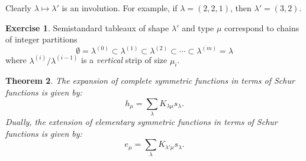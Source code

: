 \documentclass[11pt]{amsart}
\newtheorem{theorem}{Theorem}[subsection]
\theoremstyle{definition}
\theoremstyle{example}
\newtheorem{exercise}[theorem]{Exercise}
\begin{document}
Clearly $\lambda\mapsto\lambda'$ is an involution.
For example, if $\lambda=(2,2,1)$, then $\lambda'=(3,2)$.
\begin{exercise}
Semistandard tableaux of shape $\lambda'$ and type $\mu$ correspond to chains of integer partitions
  \begin{displaymath}
    \emptyset = \lambda^{(0)} \subset \lambda^{(1)}\subset \lambda^{(2)} \subset \dotsb \subset \lambda^{(m)} = \lambda
  \end{displaymath}
  where $\lambda^{(i)}/\lambda^{(i-1)}$ is a \emph{vertical} strip of size $\mu_i$.  
\end{exercise}
\begin{theorem}
  \label{theorem:schur-to-eh}
  The expansion of complete symmetric functions in terms of Schur functions is given by:
  \begin{displaymath}
    h_\mu = \sum_\lambda K_{\lambda\mu}s_\lambda.
  \end{displaymath}
  Dually, the extension of elementary symmetric functions in terms of Schur functions is given by:
  \begin{displaymath}
    e_\mu = \sum_\lambda K_{\lambda'\mu}s_\lambda.
  \end{displaymath}
\end{theorem}
\end{document}
